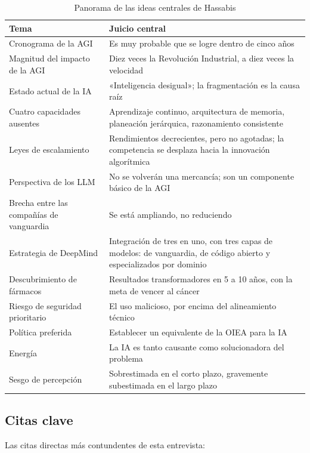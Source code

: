 \documentclass[a4paper]{article}
\begin{document}
\begin{table}[H]
\centering
\begin{tabular}{p{} p{}}
\toprule
\textbf{Tema} & \textbf{Juicio central} \\
\midrule
Cronograma de la AGI & Es muy probable que se logre dentro de cinco años \\
Magnitud del impacto de la AGI & Diez veces la Revolución Industrial, a diez veces la velocidad \\
Estado actual de la IA & «Inteligencia desigual»; la fragmentación es la causa raíz \\
Cuatro capacidades ausentes & Aprendizaje continuo, arquitectura de memoria, planeación jerárquica, razonamiento consistente \\
Leyes de escalamiento & Rendimientos decrecientes, pero no agotadas; la competencia se desplaza hacia la innovación algorítmica \\
Perspectiva de los LLM & No se volverán una mercancía; son un componente básico de la AGI \\
Brecha entre las compañías de vanguardia & Se está ampliando, no reduciendo \\
Estrategia de DeepMind & Integración de tres en uno, con tres capas de modelos: de vanguardia, de código abierto y especializados por dominio \\
Descubrimiento de fármacos & Resultados transformadores en 5 a 10 años, con la meta de vencer al cáncer \\
Riesgo de seguridad prioritario & El uso malicioso, por encima del alineamiento técnico \\
Política preferida & Establecer un equivalente de la OIEA para la IA \\
Energía & La IA es tanto causante como solucionadora del problema \\
Sesgo de percepción & Sobrestimada en el corto plazo, gravemente subestimada en el largo plazo \\
\bottomrule
\end{tabular}
\caption{Panorama de las ideas centrales de Hassabis}
\end{table}

\subsection{Citas clave}

Las citas directas más contundentes de esta entrevista:
\end{document}
